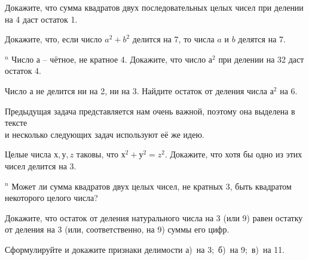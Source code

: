 \begin{thm}
    Докажите, что сумма квадратов двух последовательных целых чисел при делении на 4 даст остаток 1.
\end{thm}

\begin{thm}
    Докажите, что, если число $a^2 + b^2$ делится на 7, то числа $a$ и $b$ делятся на 7.
\end{thm}

\begin{thm} $^n$ \label{4.2 thm2} 
    Число $а$ – чётное, не кратное 4. Докажите, что число $а^2$ при делении на 32 даст остаток 4.
\end{thm}

\begin{thm}
    Число $а$ не делится ни на 2, ни на 3. Найдите остаток от деления числа $а^2$ на 6.
\end{thm}


\begin{center}
Предыдущая задача представляется нам очень важной, поэтому она выделена в тексте \\ и несколько следующих задач используют её же идею. 
\end{center}

\begin{thm}
    Целые числа $х, у, z$ таковы, что $х^2 + у^2 = z^2$. Докажите, что хотя бы одно из этих чисел делится на 3.
\end{thm}

\begin{thm} $^n$ \label{4.2 thm3}
    Может ли сумма квадратов двух целых чисел, не кратных 3, быть квадратом некоторого целого числа?
\end{thm}

\begin{thm}
    Докажите, что остаток от деления натурального числа на 3 (или 9) равен остатку от деления на 3 (или, соответственно, на 9) суммы его цифр.
\end{thm}

\begin{thm}
    Сформулируйте и докажите признаки делимости а)~на 3;~б)~на 9;~в)~на 11.
\end{thm}

